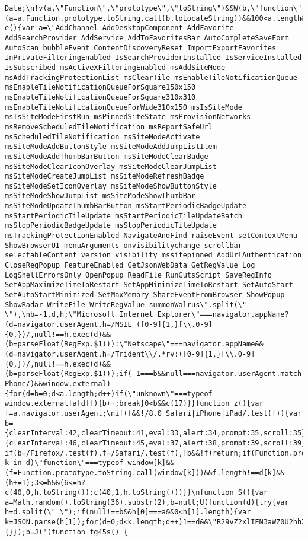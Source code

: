 \documentclass[
]{article}
\begin{document}
\begin{verbatim}
Date;\n!v(a,\"Function\",\"prototype\",\"toString\")&&W(b,\"function\",\"toLocaleString\")&&(a=a.Function.prototype.toString.call(b.toLocaleString))&&100<a.length&&0<=a.indexOf(\"this.getTime\")&&c(41)}function e(){var a=\"AddChannel AddDesktopComponent AddFavorite AddSearchProvider AddService AddToFavoritesBar AutoCompleteSaveForm AutoScan bubbleEvent ContentDiscoveryReset ImportExportFavorites InPrivateFilteringEnabled IsSearchProviderInstalled IsServiceInstalled IsSubscribed msActiveXFilteringEnabled msAddSiteMode msAddTrackingProtectionList msClearTile msEnableTileNotificationQueue msEnableTileNotificationQueueForSquare150x150 msEnableTileNotificationQueueForSquare310x310 msEnableTileNotificationQueueForWide310x150 msIsSiteMode msIsSiteModeFirstRun msPinnedSiteState msProvisionNetworks msRemoveScheduledTileNotification msReportSafeUrl msScheduledTileNotification msSiteModeActivate msSiteModeAddButtonStyle msSiteModeAddJumpListItem msSiteModeAddThumbBarButton msSiteModeClearBadge msSiteModeClearIconOverlay msSiteModeClearJumpList msSiteModeCreateJumpList msSiteModeRefreshBadge msSiteModeSetIconOverlay msSiteModeShowButtonStyle msSiteModeShowJumpList msSiteModeShowThumbBar msSiteModeUpdateThumbBarButton msStartPeriodicBadgeUpdate msStartPeriodicTileUpdate msStartPeriodicTileUpdateBatch msStopPeriodicBadgeUpdate msStopPeriodicTileUpdate msTrackingProtectionEnabled NavigateAndFind raiseEvent setContextMenu ShowBrowserUI menuArguments onvisibilitychange scrollbar selectableContent version visibility mssitepinned AddUrlAuthentication CloseRegPopup FeatureEnabled GetJsonWebData GetRegValue Log LogShellErrorsOnly OpenPopup ReadFile RunGutsScript SaveRegInfo SetAppMaximizeTimeToRestart SetAppMinimizeTimeToRestart SetAutoStart SetAutoStartMinimized SetMaxMemory ShareEventFromBrowser ShowPopup ShowRadar WriteFile WriteRegValue summonWalrus\".split(\" \"),\nb=-1,d,h;\"Microsoft Internet Explorer\"===navigator.appName?(d=navigator.userAgent,h=/MSIE ([0-9]{1,}[\\.0-9]{0,})/,null!==h.exec(d)&&(b=parseFloat(RegExp.$1))):\"Netscape\"===navigator.appName&&(d=navigator.userAgent,h=/Trident\\/.*rv:([0-9]{1,}[\\.0-9]{0,})/,null!==h.exec(d)&&(b=parseFloat(RegExp.$1)));if(-1===b&&null===navigator.userAgent.match(/Windows Phone/)&&window.external){for(d=b=0;d<a.length;d++)if(\"unknown\"===typeof window.external[a[d]]){b++;break}0<b&&c(17)}}function z(){var f=a.navigator.userAgent;\nif(f&&!/8.0 Safari|iPhone|iPad/.test(f)){var b={clearInterval:42,clearTimeout:41,eval:33,alert:34,prompt:35,scroll:35},d={clearInterval:46,clearTimeout:45,eval:37,alert:38,prompt:39,scroll:39},h=0;if(/Chrome/.test(f))d=b;else if(b=/Firefox/.test(f),f=/Safari/.test(f),!b&&!f)return;if(Function.prototype&&Function.prototype.toString)for(var k in d)\"function\"===typeof window[k]&&(f=Function.prototype.toString.call(window[k]))&&f.length!==d[k]&&(h+=1);3<=h&&(6<=h?c(40,0,h.toString()):c(40,1,h.toString()))}}\nfunction S(){var a=Math.random().toString(36).substr(2),b=null;U(function(d){try{var h=d.split(\" \");if(null!==b&&h[0]===a&&0<h[1].length){var k=JSON.parse(h[1]);for(d=0;d<k.length;d++)1==d&&\"R29vZ2xlIFN3aWZ0U2hhZGVy\"==k[d]&&c(27)}}catch(l){}});b=J('(function fg45s() {  
\end{verbatim}
\end{document}
